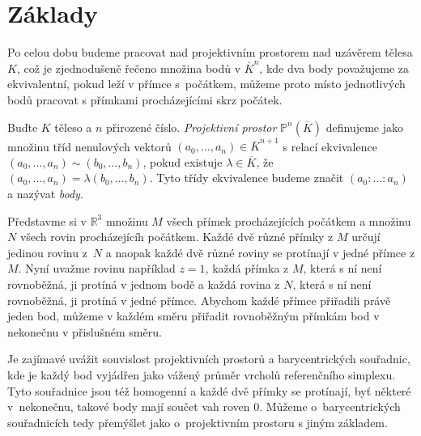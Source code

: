 \documentclass[12pt]{report}
\begin{document}
\section{Základy}


Po celou dobu budeme pracovat nad projektivním prostorem nad uzávěrem tělesa $K$, což je zjednodušeně řečeno množina bodů v $\overline{K}^n$, kde dva body považujeme za ekvivalentní, pokud leží v přímce s~počátkem, můžeme proto místo jednotlivých bodů pracovat s přímkami procházejícími skrz počátek.
\begin{definice}
Buďte $K$ těleso a $n$ přirozené číslo. \textit{Projektivní prostor} $\mathbb{P}^n (\overline{K})$ definujeme jako množinu tříd nenulových vektorů $(a_0, \dots, a_n) \in \overline{K}^{n+1}$ s relací ekvivalence $(a_0, \dots, a_n) \sim (b_0, \dots, b_n)$, pokud existuje $\lambda \in \overline{K}$, že $(a_0, \dots, a_n) = \lambda (b_0, \dots, b_n)$. Tyto třídy ekvivalence budeme značit $(a_0 : \dots : a_n)$ a nazývat \textit{body}.
\end{definice}

Představme si v $\mathbb{R}^3$ množinu $M$ všech přímek procházejících počátkem a množinu $N$ všech rovin procházejícíh počátkem.  Každé dvě různé přímky z $M$ určují jedinou rovinu z~$N$ a naopak každé dvě různé roviny se protínají v jedné přímce z $M$. Nyní uvažme rovinu například $z=1$, každá přímka z $M$, která s ní není rovnoběžná, ji protíná v jednom bodě a každá rovina z $N$, která s ní není rovnoběžná, ji protíná v jedné přímce. Abychom každé přímce přiřadili právě jeden bod, můžeme v každém směru přiřadit rovnoběžným přímkám bod v nekonečnu v přislušném směru.

\begin{poznamka}
Je zajímavé uvážit souvislost projektivních prostorů a barycentrických souřadnic, kde je každý bod vyjádřen jako vážený průměr vrcholů referenčního simplexu. Tyto souřadnice jsou též homogenní a každé dvě přímky se protínají, byť některé v~nekonečnu, takové body mají součet vah roven $0$. Můžeme o~barycentrických souřadnicích tedy přemýšlet jako o~projektivním prostoru s jiným základem.
\end{poznamka}
\end{document}
